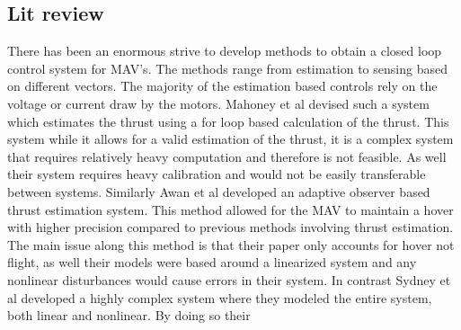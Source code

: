 \documentclass[conference]{IEEEtran}
\begin{document}
	\subsection{Lit review}
	There has been an enormous strive to develop methods to obtain a closed loop control system for MAV's. The methods range from estimation to sensing based on different vectors. The majority of the estimation based controls rely on the voltage or current draw by the motors. Mahoney et al \cite{mahoney1} devised such a system which estimates the thrust using a for loop based calculation of the thrust. This system while it allows for a valid estimation of the thrust, it is a complex system that requires relatively heavy computation and therefore is not feasible. As well their system requires heavy calibration and would not be easily transferable between systems. Similarly Awan et al \cite{awan} developed an adaptive observer based thrust estimation system. This method allowed for the MAV to maintain a hover with higher precision compared to previous methods involving thrust estimation. The main issue along this method is that their paper only accounts for hover not flight, as well their models were based around a linearized system and any nonlinear disturbances would cause errors in their system. In contrast Sydney et al \cite{sydney} developed a highly complex system where they modeled the entire system, both linear and nonlinear. By doing so their 	
	
\end{document}
